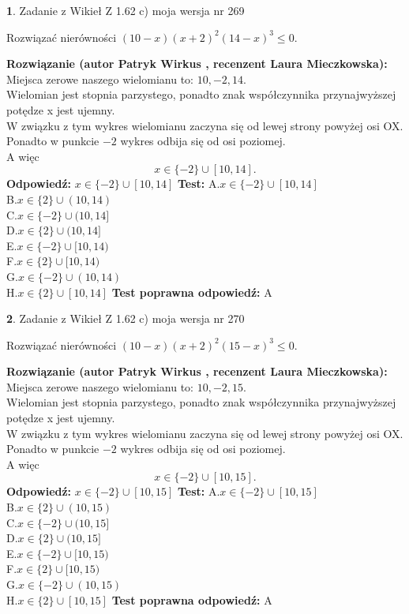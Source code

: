 \documentclass[12pt, a4paper]{article}
\theoremstyle{definition} %
\newtheorem{zad}{}
\newcommand{\zadStart}[1]{\begin{zad}#1\newline}
\newcommand{\zadStop}{\end{zad}}
\newcommand{\rozwStart}[2]{\noindent \textbf{Rozwiązanie (autor #1 , recenzent #2): }\newline}
\newcommand{\rozwStop}{\newline}
\newcommand{\odpStart}{\noindent \textbf{Odpowiedź:}\newline}
\newcommand{\odpStop}{\newline}
\newcommand{\testStart}{\noindent \textbf{Test:}\newline}
\newcommand{\testStop}{\newline}
\newcommand{\kluczStart}{\noindent \textbf{Test poprawna odpowiedź:}\newline}
\newcommand{\kluczStop}{\newline}
\begin{document}
\zadStart{Zadanie z Wikieł Z 1.62 c) moja wersja nr 269}

Rozwiązać nierówności $(10-x)(x+2)^{2}(14-x)^{3}\le0$.
\zadStop
\rozwStart{Patryk Wirkus}{Laura Mieczkowska}
Miejsca zerowe naszego wielomianu to: $10, -2, 14$.\\
Wielomian jest stopnia parzystego, ponadto znak współczynnika przy\linebreak najwyższej potędze x jest ujemny.\\ W związku z tym wykres wielomianu zaczyna się od lewej strony powyżej osi OX.\\
Ponadto w punkcie $-2$ wykres odbija się od osi poziomej.\\
A więc $$x \in \{-2\} \cup [10,14].$$
\rozwStop
\odpStart
$x \in \{-2\} \cup [10,14]$
\odpStop
\testStart
A.$x \in \{-2\} \cup [10,14]$\\
B.$x \in \{2\} \cup (10,14)$\\
C.$x \in \{-2\} \cup (10,14]$\\
D.$x \in \{2\} \cup (10,14]$\\
E.$x \in \{-2\} \cup [10,14)$\\
F.$x \in \{2\} \cup [10,14)$\\
G.$x \in \{-2\} \cup (10,14)$\\
H.$x \in \{2\} \cup [10,14]$
\testStop
\kluczStart
A
\kluczStop



\zadStart{Zadanie z Wikieł Z 1.62 c) moja wersja nr 270}

Rozwiązać nierówności $(10-x)(x+2)^{2}(15-x)^{3}\le0$.
\zadStop
\rozwStart{Patryk Wirkus}{Laura Mieczkowska}
Miejsca zerowe naszego wielomianu to: $10, -2, 15$.\\
Wielomian jest stopnia parzystego, ponadto znak współczynnika przy\linebreak najwyższej potędze x jest ujemny.\\ W związku z tym wykres wielomianu zaczyna się od lewej strony powyżej osi OX.\\
Ponadto w punkcie $-2$ wykres odbija się od osi poziomej.\\
A więc $$x \in \{-2\} \cup [10,15].$$
\rozwStop
\odpStart
$x \in \{-2\} \cup [10,15]$
\odpStop
\testStart
A.$x \in \{-2\} \cup [10,15]$\\
B.$x \in \{2\} \cup (10,15)$\\
C.$x \in \{-2\} \cup (10,15]$\\
D.$x \in \{2\} \cup (10,15]$\\
E.$x \in \{-2\} \cup [10,15)$\\
F.$x \in \{2\} \cup [10,15)$\\
G.$x \in \{-2\} \cup (10,15)$\\
H.$x \in \{2\} \cup [10,15]$
\testStop
\kluczStart
A
\kluczStop
\end{document}
